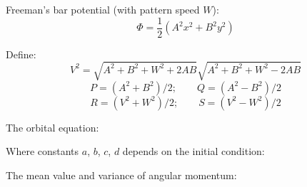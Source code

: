 \documentclass[fleqn]{article}
\begin{document}
Freeman's bar potential (with pattern speed $W$):
\[ \Phi = \frac{1}{2}(A^2 x^2 + B^2 y^2) \]

Define:
\[ V^2 = \sqrt{A^2 + B^2 + W^2 + 2AB}\sqrt{A^2 + B^2 + W^2 - 2AB} \]
\[ P = (A^2 + B^2) / 2; \qquad Q = (A^2 - B^2) / 2 \]
\[ R = (V^2 + W^2) / 2; \qquad S = (V^2 - W^2) / 2 \]

The orbital equation:


Where constants $a$, $b$, $c$, $d$ depends on the initial condition:


The mean value and variance of angular momentum:

\end{document}
